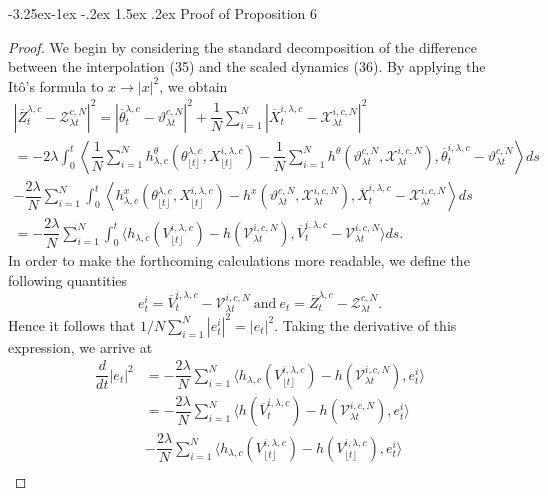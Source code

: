 \documentclass[a4paper, 10pt]{article}
\makeatletter
\theoremstyle{plain}%
\renewcommand\subsubsection{\@startsection{subsubsection}{3}{\z@}%
  {-3.25ex\@plus -1ex \@minus -.2ex}%
  {1.5ex \@plus .2ex}%
  {\normalfont\small\itshape\mdseries}}
\makeatother
\begin{document}
\subsubsection{Proof of Proposition 6}\label{Proof6}
\begin{proof}
    We begin by considering the standard decomposition of the difference between the interpolation (35) and the scaled dynamics (36). By applying the It\^{o}'s formula to $x\to |x|^2$, we obtain
\begin{gather*}
|\overline{Z}^{\lambda,c}_t-\mathcal{Z}_{\lambda t}^{c,N}|^2=|\overline{\theta}^{\lambda,c}_t-{\vartheta}_{\lambda t}^{c,N}|^2+\dfrac{1}{N}\sum_{i=1}^N|\overline{X}^{i,\lambda,c}_t-\mathcal{X}_{\lambda t}^{i,c,N}|^2\\
=-2\lambda\int_0^t\left\langle \dfrac{1}{N}\sum_{i=1}^N h^{\theta}_{\lambda,c}(\theta_{\lfloor{t}\rfloor}^{\lambda,c},X^{i,\lambda,c}_{\lfloor{t}\rfloor})-\dfrac{1}{N}\sum_{i=1}^Nh^{\theta}({\vartheta}_{\lambda t}^{c,N},\mathcal{X}_{\lambda t}^{i,c,N}),\overline{{\theta}}_{t}^{i,\lambda,c}-{\vartheta}_{\lambda t}^{c,N}\right\rangle ds\\
-\dfrac{2\lambda}{N}\sum_{i=1}^N\int_0^t\left\langle h^{x}_{\lambda,c}(\theta_{\lfloor{t}\rfloor}^{\lambda,c},X^{i,\lambda,c}_{\lfloor{t}\rfloor})-h^{x}({\vartheta}_{\lambda t}^{c,N},\mathcal{X}_{\lambda t}^{i,c,N}), \overline{X}_{t}^{i,\lambda,c}-\mathcal{X}_{\lambda t}^{i,c,N}\right\rangle ds\\
=-\dfrac{2\lambda}{N}\sum_{i=1}^N\int_0^t \langle h_{\lambda,c}(V_{\lfloor{t}\rfloor}^{i,\lambda,c})-h(\mathcal{V}_{\lambda t}^{i,c,N}) , \overline{V}_{t}^{i,\lambda,c}-\mathcal{V}_{\lambda t}^{i,c,N}\rangle ds.
\end{gather*}
In order to make the forthcoming calculations more readable, we define the following quantities
$$e^i_t=\overline{V}_{t}^{i,\lambda,c}-\mathcal{V}_{\lambda t}^{i,c,N}\ \text{and}\ e_t=\overline{Z}^{\lambda,c}_t-\mathcal{Z}_{\lambda t}^{c,N}.$$ Hence it follows that $1/N\sum_{i=1}^N |e^i_t|^2=|e_t|^2.$ Taking the derivative of this expression, we arrive at
\begin{align}
\dfrac{d}{dt}|e_t|^2&=-\dfrac{2\lambda}{N}\sum_{i=1}^N\langle  h_{\lambda,c}(V_{\lfloor{t}\rfloor}^{i,\lambda,c})-h(\mathcal{V}_{\lambda t}^{i,c,N}), e_t^i\rangle\nonumber\\
&=-\dfrac{2\lambda}{N}\sum_{i=1}^N\langle  h(\overline{V}_{t}^{i,\lambda,c})-h(\mathcal{V}_{\lambda t}^{i,c,N}), e_t^i\rangle\nonumber\\
&-\dfrac{2\lambda}{N}\sum_{i=1}^N\langle  h_{\lambda,c}(V_{\lfloor{t}\rfloor}^{i,\lambda,c})-h(V_{\lfloor{t}\rfloor}^{i,\lambda,c}), e_t^i\rangle\nonumber\\

\end{align}
\end{proof}
\end{document}

